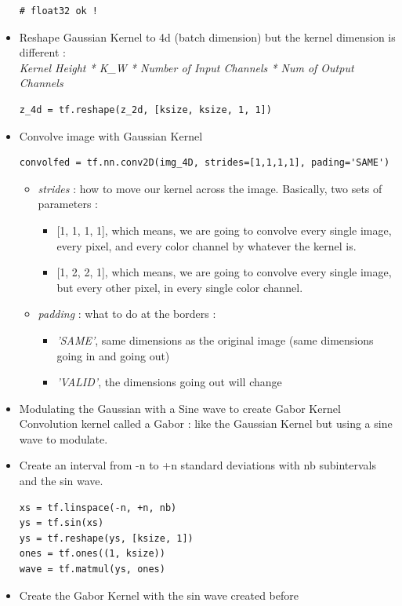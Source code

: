 \documentclass[12pt,a4paper]{article}
\begin{document}
\begin{itemize}
\begin{lstlisting}
# float32 ok !
\end{lstlisting}
\item Reshape Gaussian Kernel to 4d (batch dimension) but the kernel dimension is different : \\
\textit{Kernel Height * K\_W * Number of Input Channels * Num of Output Channels}
\begin{lstlisting}
z_4d = tf.reshape(z_2d, [ksize, ksize, 1, 1])
\end{lstlisting}
\item Convolve image with Gaussian Kernel
\begin{lstlisting}
convolfed = tf.nn.conv2D(img_4D, strides=[1,1,1,1], pading='SAME')
\end{lstlisting}
\begin{itemize}
\item \textit{strides} : how to move our kernel across the image. Basically, two sets of parameters :
\begin{itemize}
\item \textbf{}[1, 1, 1, 1], which means, we are going to convolve every single image, every pixel, and every color channel by whatever the kernel is.
\item \textbf{}[1, 2, 2, 1], which means, we are going to convolve every single image, but every other pixel, in every single color channel.
\end{itemize}
\item \textit{padding} : what to do at the borders :
\begin{itemize}
\item \textit{'SAME'}, same dimensions as the original image (same dimensions going in and going out)
\item \textit{'VALID'}, the dimensions going out will change
\end{itemize}
\end{itemize}
\item Modulating the Gaussian with a Sine wave to create Gabor Kernel\\
Convolution kernel called a Gabor : like the Gaussian Kernel but using a sine wave to modulate.
\item Create an interval from -n to +n standard deviations with nb subintervals and the sin wave.
\begin{lstlisting}
xs = tf.linspace(-n, +n, nb)
ys = tf.sin(xs)
ys = tf.reshape(ys, [ksize, 1])
ones = tf.ones((1, ksize))
wave = tf.matmul(ys, ones)
\end{lstlisting}
\item Create the Gabor Kernel with the sin wave created before

\end{itemize}
\end{document}
